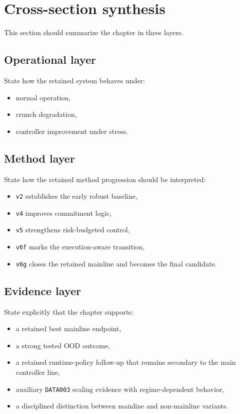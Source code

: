 \section{Cross-section synthesis}
\label{sec:results-synthesis}

This section should summarize the chapter in three layers.

\subsection{Operational layer}
\label{sec:results-synthesis-operational}

State how the retained system behaves under:
\begin{itemize}
    \item normal operation,
    \item crunch degradation,
    \item controller improvement under stress.
\end{itemize}

\subsection{Method layer}
\label{sec:results-synthesis-method}

State how the retained method progression should be interpreted:
\begin{itemize}
    \item \texttt{v2} establishes the early robust baseline,
    \item \texttt{v4} improves commitment logic,
    \item \texttt{v5} strengthens risk-budgeted control,
    \item \texttt{v6f} marks the execution-aware transition,
    \item \texttt{v6g} closes the retained mainline and becomes the final candidate.
\end{itemize}

\subsection{Evidence layer}
\label{sec:results-synthesis-evidence}

State explicitly that the chapter supports:
\begin{itemize}
    \item a retained best mainline endpoint,
    \item a strong tested OOD outcome,
    \item a retained runtime-policy follow-up that remains secondary to the main controller line,
    \item auxiliary \texttt{DATA003} scaling evidence with regime-dependent behavior,
    \item a disciplined distinction between mainline and non-mainline variants.
\end{itemize}


